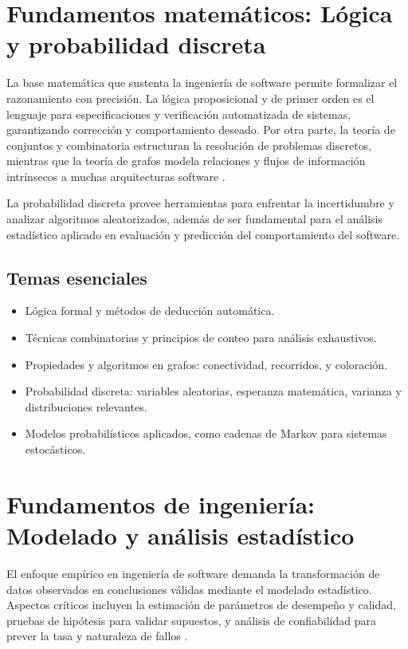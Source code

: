 \section{Fundamentos matemáticos: Lógica y probabilidad discreta}
La base matemática que sustenta la ingeniería de software permite formalizar el razonamiento con precisión. La lógica proposicional y de primer orden es el lenguaje para especificaciones y verificación automatizada de sistemas, garantizando corrección y comportamiento deseado. Por otra parte, la teoría de conjuntos y combinatoria estructuran la resolución de problemas discretos, mientras que la teoría de grafos modela relaciones y flujos de información intrínsecos a muchas arquitecturas software \parencite{rosen2019,ross2014}.

La probabilidad discreta provee herramientas para enfrentar la incertidumbre y analizar algoritmos aleatorizados, además de ser fundamental para el análisis estadístico aplicado en evaluación y predicción del comportamiento del software.

\subsection*{Temas esenciales}
\begin{itemize}
  \item Lógica formal y métodos de deducción automática.
  \item Técnicas combinatorias y principios de conteo para análisis exhaustivos.
  \item Propiedades y algoritmos en grafos: conectividad, recorridos, y coloración.
  \item Probabilidad discreta: variables aleatorias, esperanza matemática, varianza y distribuciones relevantes.
  \item Modelos probabilísticos aplicados, como cadenas de Markov para sistemas estocásticos.
\end{itemize}


\section{Fundamentos de ingeniería: Modelado y análisis estadístico}
El enfoque empírico en ingeniería de software demanda la transformación de datos observados en conclusiones válidas mediante el modelado estadístico. Aspectos críticos incluyen la estimación de parámetros de desempeño y calidad, pruebas de hipótesis para validar supuestos, y análisis de confiabilidad para prever la tasa y naturaleza de fallos \parencite{ross2014,swebok2024}.

